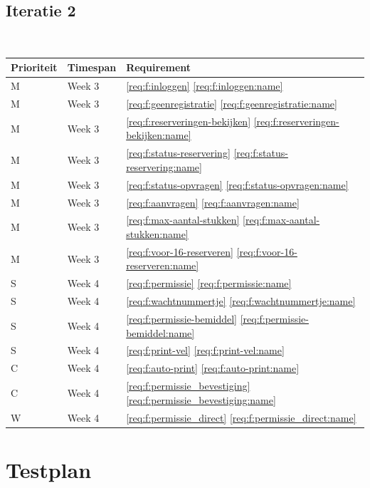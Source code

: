 \documentclass[a4paper,titlepage]{report}
\def\namedref#1{\ref{#1} \ref{#1:name}}
\begin{document}
  \section{Iteratie 2}
    \hfill\\
    \begin{tabular}{| p{} p{} p{} |}
      \hline
      \textbf{Prioriteit} & \textbf{Timespan} & \textbf{Requirement} \\
      \hline
      M & Week 3 & \namedref{req:f:inloggen}\\ \hline
      M & Week 3 & \namedref{req:f:geenregistratie}\\ \hline
      M & Week 3 & \namedref{req:f:reserveringen-bekijken}\\ \hline
      M & Week 3 & \namedref{req:f:status-reservering}\\ \hline
      M & Week 3 & \namedref{req:f:status-opvragen}\\ \hline
      M & Week 3 & \namedref{req:f:aanvragen}\\ \hline
      M & Week 3 & \namedref{req:f:max-aantal-stukken}\\ \hline
      M & Week 3 & \namedref{req:f:voor-16-reserveren}\\ \hline
      S & Week 4 & \namedref{req:f:permissie}\\ \hline
      S & Week 4 & \namedref{req:f:wachtnummertje}\\ \hline
      S & Week 4 & \namedref{req:f:permissie-bemiddel}\\ \hline
      S & Week 4 & \namedref{req:f:print-vel}\\ \hline
      C & Week 4 & \namedref{req:f:auto-print}\\ \hline
      C & Week 4 & \namedref{req:f:permissie_bevestiging}\\ \hline
      W & Week 4 & \namedref{req:f:permissie_direct}\\ \hline
    \end{tabular}

\chapter{Testplan}
  \label{cha:testplan}
\end{document}

